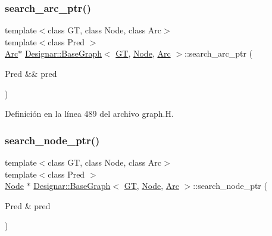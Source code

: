 \subsubsection{\texorpdfstring{search\+\_\+arc\+\_\+ptr()}{search\_arc\_ptr()}\hspace{0.1cm}{\footnotesize\ttfamily [2/2]}}
{\footnotesize\ttfamily template$<$class GT, class Node, class Arc$>$ \\
template$<$class Pred $>$ \\
\hyperlink{namespace_designar_a3f55fb5513d62ff47cbc8f72b8e95d6f}{Arc}$\ast$ \hyperlink{class_designar_1_1_base_graph}{Designar\+::\+Base\+Graph}$<$ \hyperlink{demo-buildgraph_8_c_a3001c40d2c31ca87ed96cd7d1334a55e}{GT}, \hyperlink{namespace_designar_a5af326c65aa2bd26b26c410f2030d09e}{Node}, \hyperlink{namespace_designar_a3f55fb5513d62ff47cbc8f72b8e95d6f}{Arc} $>$\+::search\+\_\+arc\+\_\+ptr (\begin{DoxyParamCaption}\item[{Pred \&\&}]{pred }\end{DoxyParamCaption})\hspace{0.3cm}{\ttfamily [inline]}}



Definición en la línea 489 del archivo graph.\+H.

\mbox{\label{class_designar_1_1_base_graph_aa15b13f58a4961b1593045d1e228adec}} 
\subsubsection{\texorpdfstring{search\+\_\+node\+\_\+ptr()}{search\_node\_ptr()}\hspace{0.1cm}{\footnotesize\ttfamily [1/2]}}
{\footnotesize\ttfamily template$<$class GT, class Node, class Arc$>$ \\
template$<$class Pred $>$ \\
\hyperlink{namespace_designar_a5af326c65aa2bd26b26c410f2030d09e}{Node} $\ast$ \hyperlink{class_designar_1_1_base_graph}{Designar\+::\+Base\+Graph}$<$ \hyperlink{demo-buildgraph_8_c_a3001c40d2c31ca87ed96cd7d1334a55e}{GT}, \hyperlink{namespace_designar_a5af326c65aa2bd26b26c410f2030d09e}{Node}, \hyperlink{namespace_designar_a3f55fb5513d62ff47cbc8f72b8e95d6f}{Arc} $>$\+::search\+\_\+node\+\_\+ptr (\begin{DoxyParamCaption}\item[{Pred \&}]{pred }\end{DoxyParamCaption})\hspace{0.3cm}{\ttfamily [inline]}}




